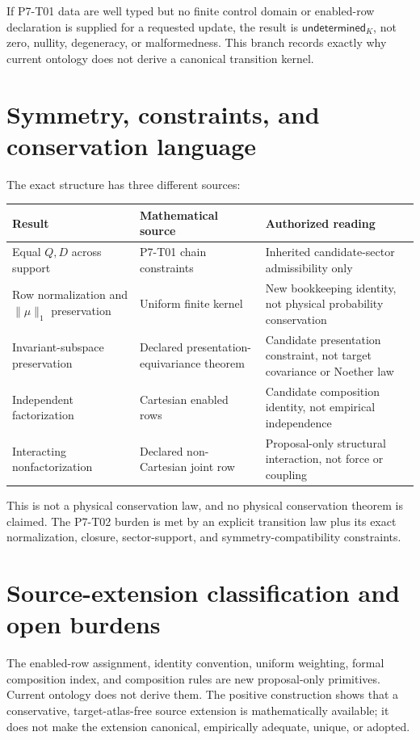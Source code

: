 \documentclass[11pt]{article}
\newcommand{\Undetermined}{\mathsf{undetermined}_K}
\begin{document}
If P7-T01 data are well typed but no finite control domain or enabled-row
declaration is supplied for a requested update, the result is
\(\Undetermined\), not zero, nullity, degeneracy, or malformedness. This
branch records exactly why current ontology does not derive a canonical
transition kernel.

\section{Symmetry, constraints, and conservation language}

The exact structure has three different sources:
\begin{longtable}{p{}p{}p{}}
\toprule
Result & Mathematical source & Authorized reading\\
\midrule
Equal \(Q,D\) across support &
P7-T01 chain constraints &
Inherited candidate-sector admissibility only\\
Row normalization and \(\|\mu\|_1\) preservation &
Uniform finite kernel &
New bookkeeping identity, not physical probability conservation\\
Invariant-subspace preservation &
Declared presentation-equivariance theorem &
Candidate presentation constraint, not target covariance or Noether law\\
Independent factorization &
Cartesian enabled rows &
Candidate composition identity, not empirical independence\\
Interacting nonfactorization &
Declared non-Cartesian joint row &
Proposal-only structural interaction, not force or coupling\\
\bottomrule
\end{longtable}

This is not a physical conservation law, and no physical conservation theorem
is claimed. The P7-T02 burden is met by an
explicit transition law plus its exact normalization, closure, sector-support,
and symmetry-compatibility constraints.

\section{Source-extension classification and open burdens}

The enabled-row assignment, identity convention, uniform weighting, formal
composition index, and composition rules are new proposal-only primitives.
Current ontology does not derive them. The positive construction shows that a
conservative, target-atlas-free source extension is mathematically available;
it does not make the extension canonical, empirically adequate, unique, or
adopted.
\end{document}
